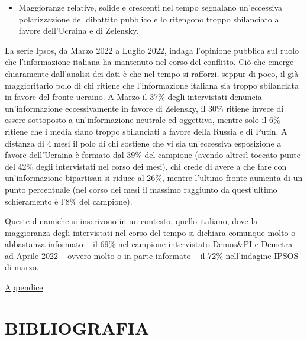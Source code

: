 \documentclass[
  openany]{book}
\providecommand{\tightlist}{%
  \setlength{\itemsep}{0pt}\setlength{\parskip}{0pt}}
\begin{document}
\begin{itemize}
\tightlist
\item
  Maggioranze relative, solide e crescenti nel tempo segnalano un'eccessiva polarizzazione del dibattito pubblico e lo ritengono troppo sbilanciato a favore dell'Ucraina e di Zelensky.
\end{itemize}

La serie Ipsos, da Marzo 2022 a Luglio 2022, indaga l'opinione pubblica sul ruolo che l'informazione italiana ha mantenuto nel corso del conflitto. Ciò che emerge chiaramente dall'analisi dei dati è che nel tempo si rafforzi, seppur di poco, il già maggioritario polo di chi ritiene che l'informazione italiana sia troppo sbilanciata in favore del fronte ucraino. A Marzo il 37\% degli intervistati denuncia un'informazione eccessivamente in favore di Zelensky, il 30\% ritiene invece di essere sottoposto a un'informazione neutrale ed oggettiva, mentre solo il 6\% ritiene che i media siano troppo sbilanciati a favore della Russia e di Putin. A distanza di 4 mesi il polo di chi sostiene che vi sia un'eccessiva esposizione a favore dell'Ucraina è formato dal 39\% del campione (avendo altresì toccato punte del 42\% degli intervistati nel corso dei mesi), chi crede di avere a che fare con un'informazione bipartisan si riduce al 26\%, mentre l'ultimo fronte aumenta di un punto percentuale (nel corso dei mesi il massimo raggiunto da quest'ultimo schieramento è l'8\% del campione).

Queste dinamiche si inscrivono in un contesto, quello italiano, dove la maggioranza degli intervistati nel corso del tempo si dichiara comunque molto o abbastanza informato -- il 69\% nel campione intervistato Demos\&PI e Demetra ad Aprile 2022 -- ovvero molto o in parte informato -- il 72\% nell'indagine IPSOS di marzo.

\href{https://github.com/LucianaFazio/Ucrania/blob/main/PDF_Appendice/VIII.\%20Ruolo\%20dei\%20media.pdf}{Appendice}

\hypertarget{bibliografia}{%
\chapter*{BIBLIOGRAFIA}\label{bibliografia}}

  
\end{document}
